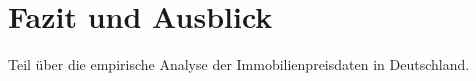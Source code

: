 \newpage

\section{Fazit und Ausblick} \label{fazitundausblick}
Teil über die empirische Analyse der Immobilienpreisdaten in Deutschland.
